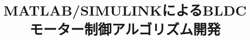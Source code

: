 \documentclass[uplatex,a4paper,twoside,10pt]{jsarticle}
\begin{document}
\title{MATLAB/SIMULINKによるBLDCモーター制御アルゴリズム開発}

\maketitle

\tableofcontents

\newpage














\end{document}
